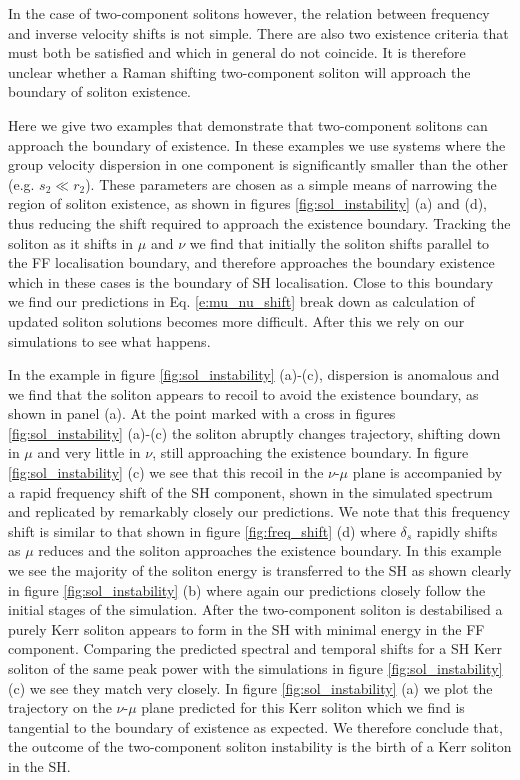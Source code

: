 \documentclass[reprint,
 amsmath,amssymb,
 pra,
]{revtex4-1}
\begin{document}
In the case of two-component solitons however, the relation between frequency and inverse velocity shifts is not simple. There are also two existence criteria that must both be satisfied and which in general do not coincide. It is therefore unclear whether a Raman shifting two-component soliton will approach the boundary of soliton existence.

Here we give two examples that demonstrate that two-component solitons can approach the boundary of existence. In these examples we use systems where the group velocity dispersion in one component is significantly smaller than the other (e.g. $s_2 \ll r_2$). These parameters are chosen as a simple means of narrowing the region of soliton existence, as shown in figures \ref{fig:sol_instability} (a) and (d), thus reducing the shift required to approach the existence boundary. Tracking the soliton as it shifts in $\mu$ and $\nu$ we find that initially the soliton shifts parallel to the FF localisation boundary, and therefore approaches the boundary existence which in these cases is the boundary of SH localisation. Close to this boundary we find our predictions in Eq. \eqref{e:mu_nu_shift} break down as calculation of updated soliton solutions becomes more difficult. After this we rely on our simulations to see what happens.

In the example in figure \ref{fig:sol_instability} (a)-(c), dispersion is anomalous and we find that the soliton appears to recoil \cite{Skryabin2003SolitonFibers} to avoid the existence boundary, as shown in panel (a). At the point marked with a cross in figures \ref{fig:sol_instability} (a)-(c) the soliton abruptly changes trajectory, shifting down in $\mu$ and very little in $\nu$, still approaching the existence boundary. In figure \ref{fig:sol_instability} (c) we see that this recoil in the $\nu$-$\mu$ plane is accompanied by a rapid frequency shift of the SH component, shown in the simulated spectrum and replicated by remarkably closely our predictions. We note that this frequency shift is similar to that shown in figure \ref{fig:freq_shift} (d) where $\delta_s$ rapidly shifts as $\mu$ reduces and the soliton approaches the existence boundary. In this example we see the majority of the soliton energy is transferred to the SH as shown clearly in figure \ref{fig:sol_instability} (b) where again our predictions closely follow the initial stages of the simulation. After the two-component soliton is destabilised a purely Kerr soliton appears to form in the SH with minimal energy in the FF component. Comparing the predicted spectral and temporal shifts for a SH Kerr soliton of the same peak power with the simulations in figure \ref{fig:sol_instability} (c) we see they match very closely. In figure \ref{fig:sol_instability} (a) we plot the trajectory on the $\nu$-$\mu$ plane predicted for this Kerr soliton which we find is tangential to the boundary of existence as expected. We therefore conclude that,  the outcome of the two-component soliton instability is the birth of a Kerr soliton in the SH. 
\end{document}
